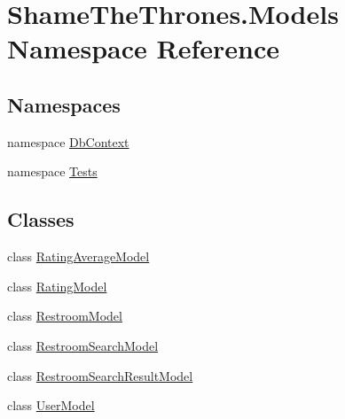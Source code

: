 \hypertarget{namespace_shame_the_thrones_1_1_models}{}\section{Shame\+The\+Thrones.\+Models Namespace Reference}
\label{namespace_shame_the_thrones_1_1_models}
\subsection*{Namespaces}
\begin{DoxyCompactItemize}
\item 
namespace \hyperlink{namespace_shame_the_thrones_1_1_models_1_1_db_context}{Db\+Context}
\item 
namespace \hyperlink{namespace_shame_the_thrones_1_1_models_1_1_tests}{Tests}
\end{DoxyCompactItemize}
\subsection*{Classes}
\begin{DoxyCompactItemize}
\item 
class \hyperlink{class_shame_the_thrones_1_1_models_1_1_rating_average_model}{Rating\+Average\+Model}
\item 
class \hyperlink{class_shame_the_thrones_1_1_models_1_1_rating_model}{Rating\+Model}
\item 
class \hyperlink{class_shame_the_thrones_1_1_models_1_1_restroom_model}{Restroom\+Model}
\item 
class \hyperlink{class_shame_the_thrones_1_1_models_1_1_restroom_search_model}{Restroom\+Search\+Model}
\item 
class \hyperlink{class_shame_the_thrones_1_1_models_1_1_restroom_search_result_model}{Restroom\+Search\+Result\+Model}
\item 
class \hyperlink{class_shame_the_thrones_1_1_models_1_1_user_model}{User\+Model}
\end{DoxyCompactItemize}
